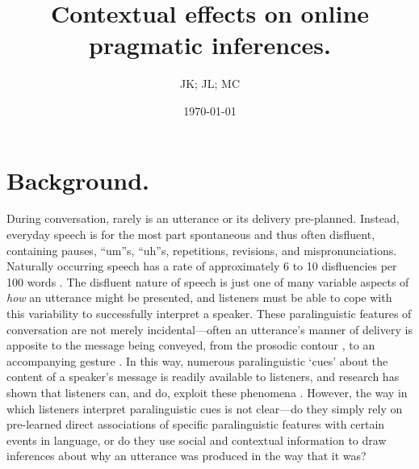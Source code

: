 \documentclass[man]{apa6}
\begin{document}
\title{Contextual effects on online pragmatic inferences.}
\author{JK; JL; MC}
\date{\today}
\maketitle

\section{Background.}
During conversation, rarely is an utterance or its delivery pre-planned.
Instead, everyday speech is for the most part spontaneous and thus often disfluent, containing pauses, ``um''s, ``uh''s, repetitions, revisions, and mispronunciations. 
Naturally occurring speech has a rate of approximately 6 to 10 disfluencies per 100 words \citep{Bortfeld2001, FoxTree1995}.
The disfluent nature of speech is just one of many variable aspects of \textit{how} an utterance might be presented, and listeners must be able to cope with this variability to successfully interpret a speaker.
These paralinguistic features of conversation are not merely incidental---often an utterance's manner of delivery is apposite to the message being conveyed, from the prosodic contour \citep{Fernald1991}, to an accompanying gesture \citep{Alibali2001}. 
In this way, numerous paralinguistic `cues' about the content of a speaker's message is readily available to listeners, and research has shown that listeners can, and do, exploit these phenomena \citep{Corley2007, Barr2001, Hostetter2011, Frazier2006}.
However, the way in which listeners interpret paralinguistic cues is not clear---do they simply rely on pre-learned direct associations of specific paralinguistic features with certain events in language, or do they use social and contextual information to draw inferences about why an utterance was produced in the way that it was? \\
\end{document}
